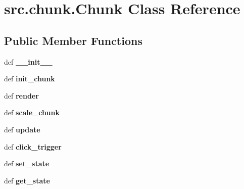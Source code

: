 \hypertarget{classsrc_1_1chunk_1_1_chunk}{\section{src.\-chunk.\-Chunk \-Class \-Reference}
\label{classsrc_1_1chunk_1_1_chunk}
}
\subsection*{\-Public \-Member \-Functions}
\begin{DoxyCompactItemize}
\item 
\hypertarget{classsrc_1_1chunk_1_1_chunk_a204817ea3174038e00cab6d259a4a10f}{def {\bfseries \-\_\-\-\_\-init\-\_\-\-\_\-}}\label{classsrc_1_1chunk_1_1_chunk_a204817ea3174038e00cab6d259a4a10f}

\item 
\hypertarget{classsrc_1_1chunk_1_1_chunk_aaccc5f228bdcef0ace593461d755b068}{def {\bfseries init\-\_\-chunk}}\label{classsrc_1_1chunk_1_1_chunk_aaccc5f228bdcef0ace593461d755b068}

\item 
\hypertarget{classsrc_1_1chunk_1_1_chunk_aea05ade2c559d3aa838103e1326c551c}{def {\bfseries render}}\label{classsrc_1_1chunk_1_1_chunk_aea05ade2c559d3aa838103e1326c551c}

\item 
\hypertarget{classsrc_1_1chunk_1_1_chunk_ab654cd02e8f331610efcc09b64b5326d}{def {\bfseries scale\-\_\-chunk}}\label{classsrc_1_1chunk_1_1_chunk_ab654cd02e8f331610efcc09b64b5326d}

\item 
\hypertarget{classsrc_1_1chunk_1_1_chunk_a13b6d94d12ddeac517d31d32c2b11fe8}{def {\bfseries update}}\label{classsrc_1_1chunk_1_1_chunk_a13b6d94d12ddeac517d31d32c2b11fe8}

\item 
\hypertarget{classsrc_1_1chunk_1_1_chunk_a34dd464aaa303fb791b7d60de9934e32}{def {\bfseries click\-\_\-trigger}}\label{classsrc_1_1chunk_1_1_chunk_a34dd464aaa303fb791b7d60de9934e32}

\item 
\hypertarget{classsrc_1_1chunk_1_1_chunk_ad109d49d69ada1329cf9d89fda50e156}{def {\bfseries set\-\_\-state}}\label{classsrc_1_1chunk_1_1_chunk_ad109d49d69ada1329cf9d89fda50e156}

\item 
\hypertarget{classsrc_1_1chunk_1_1_chunk_a716bc7b600d8a5e83ab39fbba92afb37}{def {\bfseries get\-\_\-state}}\label{classsrc_1_1chunk_1_1_chunk_a716bc7b600d8a5e83ab39fbba92afb37}

\end{DoxyCompactItemize}

